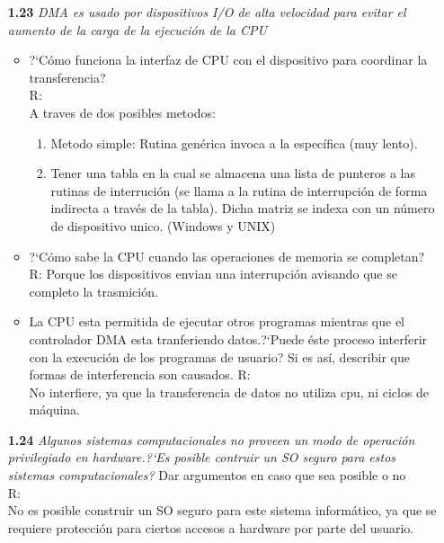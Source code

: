 \begin{itemize}
\item[\textbf{1.23}] \emph{DMA es usado por dispositivos I/O de alta velocidad
para evitar el aumento de la carga de la ejecuci\'on de la CPU}\\
	\begin{itemize}
		\item ?`C\'omo funciona la interfaz de CPU con el dispositivo para coordinar la transferencia?\\
R:\\
			A traves de dos posibles metodos:
			\begin{enumerate}
				\item Metodo simple: Rutina gen\'erica invoca a la espec\'ifica (muy lento).
				\item Tener una tabla en la cual se almacena una lista de punteros a las rutinas de interruci\'on (se llama a la rutina de interrupci\'on de forma indirecta a trav\'es de la tabla). Dicha matriz se indexa con un n\'umero de dispositivo unico. (Windows y UNIX)
			\end{enumerate}
		\item ?`C\'omo sabe la CPU cuando las operaciones de  memoria se completan?\\
R:
			Porque los dispositivos envian una interrupci\'on avisando que se completo la trasmici\'on.

		\item La CPU esta permitida de ejecutar otros programas mientras que el controlador DMA esta tranferiendo datos.?`Puede \'este proceso interferir con la execuci\'on de los programas de usuario? Si es as\'i, describir que formas de interferencia son causados.
R:\\
			No interfiere, ya que la transferencia de datos no utiliza cpu, ni ciclos de m\'aquina.%
	\end{itemize}

\item[\textbf{1.24}] \emph{Algunos sistemas computacionales no proveen un modo
de operaci\'on privilegiado en hardware.?`Es posible contruir un SO seguro
para estos sistemas computacionales?} Dar argumentos en caso que sea posible o
no\\
R:\\
No es posible construir un SO seguro para este sistema inform\'atico, ya que se requiere protecci\'on para ciertos accesos a hardware por parte del usuario.


\end{itemize}
